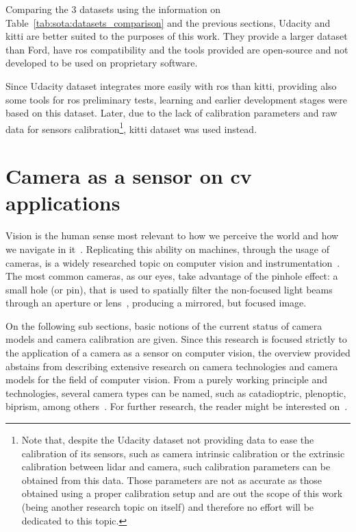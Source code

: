 
Comparing the 3 datasets using the information on Table~\ref{tab:sota:datasets_comparison} and the previous sections, Udacity and \ac{kitti} are better suited to the purposes of this work. They provide a larger dataset than Ford, have \ac{ros} compatibility and the tools provided are open-source and not developed to be used on proprietary software.

Since Udacity dataset integrates more easily with \ac{ros} than \ac{kitti}, providing also some tools for \ac{ros} preliminary tests, learning and earlier development stages were based on this dataset. Later, due to the lack of calibration parameters and raw data for sensors calibration\footnote{Note that, despite the Udacity dataset not providing data to ease the calibration of its sensors, such as camera intrinsic calibration or the extrinsic calibration between \ac{lidar} and camera, such calibration parameters can be obtained from this data. Those parameters are not as accurate as those obtained using a proper calibration setup and are out the scope of this work (being another research topic on itself) and therefore no effort will be dedicated to this topic.}, \ac{kitti} dataset was used instead.



\section{Camera as a sensor on \acl{cv} applications}
\label{sec:sota:camera}
Vision is the human sense most relevant to how we perceive the world and how we navigate in it~\cite{Ekstrom2015, Beck1983}. Replicating this ability on machines, through the usage of cameras, is a widely researched topic on computer vision and instrumentation~\cite{Beck1983}. The most common cameras, as our eyes, take advantage of the pinhole effect: a small hole (or pin), that is used to spatially filter the non-focused light beams through an aperture or lens~\cite{Beck1983, camera_models, Sturm2010}, producing a mirrored, but focused image.

On the following sub sections, basic notions of the current status of camera models and camera calibration are given. Since this research is focused strictly to the application of a camera as a sensor on computer vision, the overview provided abstains from describing extensive research on camera technologies and camera models for the field of computer vision. From a purely working principle and technologies, several camera types can be named, such as catadioptric, plenoptic, biprism, among others~\cite{Sturm2010}. %
For further research, the reader might be interested on~\cite{comercial_cameras, Sturm2010, camera_models, Merklinger1993, Photopillers}.



